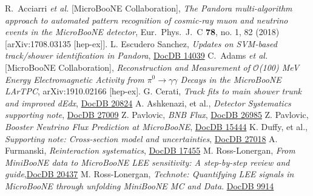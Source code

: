 \documentclass[a4paper]{article}
\begin{document}


\newpage





\begin{thebibliography}{}
  R.~Acciarri {\it et al.} [MicroBooNE Collaboration],
  \emph{The Pandora multi-algorithm approach to automated pattern recognition of cosmic-ray muon and neutrino events in the MicroBooNE detector}, Eur.\ Phys.\ J.\ C {\bf 78}, no. 1, 82 (2018) [arXiv:1708.03135 [hep-ex]].
L. Escudero Sanchez, \emph{Updates on SVM-based track/shower identification in Pandora},
\href{https://microboone-docdb.fnal.gov/cgi-bin/private/ShowDocument?docid=14039}{DocDB 14039}
  C.~Adams {\it et al.} [MicroBooNE Collaboration],
  \emph{Reconstruction and Measurement of $\mathcal{O}$(100) MeV Energy Electromagnetic Activity from $\pi^0 \rightarrow \gamma\gamma$ Decays in the MicroBooNE LArTPC},  arXiv:1910.02166 [hep-ex].
G. Cerati, \emph{Track fits to main shower trunk and improved dEdx}, \href{https://microboone-docdb.fnal.gov/cgi-bin/private/ShowDocument?docid=20824}{DocDB 20824}
A. Ashkenazi, et al., \emph{Detector Systematics supporting note}, \href{https://microboone-docdb.fnal.gov/cgi-bin/private/ShowDocument?docid=27009}{DocDB 27009}
Z. Pavlovic, \emph{BNB Flux}, \href{https://microboone-docdb.fnal.gov/cgi-bin/private/RetrieveFile?docid=26985}{DocDB 26985}
Z. Pavlovic, \emph{Booster Neutrino Flux Prediction at MicroBooNE}, \href{https://microboone-docdb.fnal.gov/cgi-bin/private/RetrieveFile?docid=15444}{DocDB 15444}
K. Duffy, et al., \emph{Supporting note: Cross-section model and uncertainties}, \href{https://microboone-docdb.fnal.gov/cgi-bin/private/ShowDocument?docid=27018}{DocDB 27018}
A. Furmanski, \emph{Reinteraction systematics}, \href{https://microboone-docdb.fnal.gov/cgi-bin/private/ShowDocument?docid=17455}{DocDB 17455}
M. Ross-Lonergan, \emph{From MiniBooNE data to MicroBooNE LEE sensitivity: A step-by-step review and guide},\href{https://microboone-docdb.fnal.gov/cgi-bin/private/RetrieveFile?docid=20437}{DocDB 20437}
 M. Ross-Lonergan, \emph{Technote: Quantifying LEE signals in MicroBooNE through unfolding MiniBooNE MC and Data}. \href{https://microboone-docdb.fnal.gov/cgi-bin/private/ShowDocument?docid=9914}{DocDB 9914}


\end{thebibliography}
\end{document}
